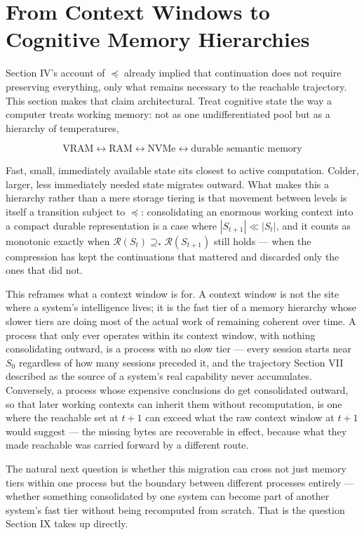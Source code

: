 \documentclass[11pt]{article}
\begin{document}
\section{From Context Windows to Cognitive Memory Hierarchies}

Section IV's account of $\preceq$ already implied that continuation does not require preserving everything, only what remains necessary to the reachable trajectory. This section makes that claim architectural. Treat cognitive state the way a computer treats working memory: not as one undifferentiated pool but as a hierarchy of temperatures,

\[
\text{VRAM} \leftrightarrow \text{RAM} \leftrightarrow \text{NVMe} \leftrightarrow \text{durable semantic memory}
\]

Fast, small, immediately available state sits closest to active computation. Colder, larger, less immediately needed state migrates outward. What makes this a hierarchy rather than a mere storage tiering is that movement between levels is itself a transition subject to $\preceq$: consolidating an enormous working context into a compact durable representation is a case where $|S_{t+1}| \ll |S_t|$, and it counts as monotonic exactly when $\mathcal{R}(S_t) \supseteq_{*} \mathcal{R}(S_{t+1})$ still holds --- when the compression has kept the continuations that mattered and discarded only the ones that did not.

This reframes what a context window is for. A context window is not the site where a system's intelligence lives; it is the fast tier of a memory hierarchy whose slower tiers are doing most of the actual work of remaining coherent over time. A process that only ever operates within its context window, with nothing consolidating outward, is a process with no slow tier --- every session starts near $S_0$ regardless of how many sessions preceded it, and the trajectory Section VII described as the source of a system's real capability never accumulates. Conversely, a process whose expensive conclusions do get consolidated outward, so that later working contexts can inherit them without recomputation, is one where the reachable set at $t{+}1$ can exceed what the raw context window at $t{+}1$ would suggest --- the missing bytes are recoverable in effect, because what they made reachable was carried forward by a different route.

The natural next question is whether this migration can cross not just memory tiers within one process but the boundary between different processes entirely --- whether something consolidated by one system can become part of another system's fast tier without being recomputed from scratch. That is the question Section IX takes up directly.
\end{document}
